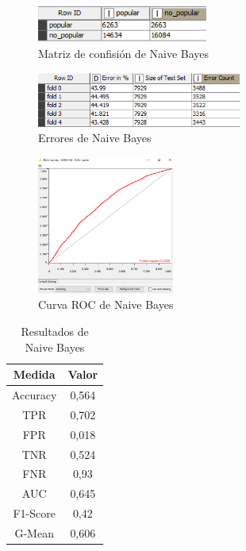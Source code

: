 	\begin{figure}[htb]
		\centering
		\includegraphics[width=0.5\textwidth]{./imagenes/19}
		\caption{Matriz de confisión de Naive Bayes} \label{fig:2}
	\end{figure}

	\begin{figure}[htb]
		\centering
		\includegraphics[width=0.6\textwidth]{./imagenes/20}
		\caption{Errores de Naive Bayes} \label{fig:2}
	\end{figure}

	\begin{figure}[htb]
		\centering
		\includegraphics[width=0.4\textwidth]{./imagenes/21}
		\caption{Curva ROC de Naive Bayes} \label{fig:1}
	\end{figure}

	\begin{table}[htbp]
		\begin{center}
			\begin{tabular}{|c|c|}
				\hline
				Medida & Valor \\
				\hline \hline
				Accuracy & 0,564 \\
				\hline
				TPR &  0,702 \\
				\hline
				FPR &  0,018 \\
				\hline
				TNR &  0,524 \\
				\hline
				FNR &  0,93 \\
				\hline
				AUC &  0,645 \\
				\hline
				F1-Score & 0,42 \\
				\hline	
				G-Mean & 0,606 \\
				\hline
			\end{tabular}
			\caption{Resultados de Naive Bayes}
			\label{tabla:sencilla}
		\end{center}
	\end{table}

